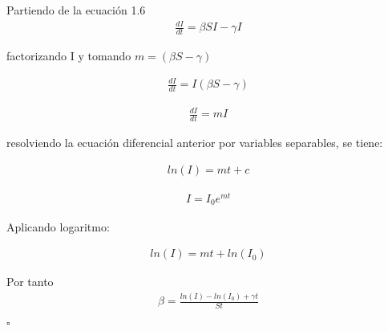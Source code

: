 \begin{Dem}
Partiendo de la ecuación 1.6 
\begin{align*}
\frac{dI}{dt} = \beta SI - \gamma I
\end{align*}

factorizando I y tomando $m = \left(\beta S - \gamma \right)$

\begin{align*}
\frac{dI}{dt} = I \left( \beta S - \gamma \right)
\end{align*}

\begin{align*}
\frac{dI}{dt} = mI
\end{align*}

resolviendo la ecuación diferencial anterior por variables separables, se tiene:

\begin{align*}
ln(I) = mt + c
\end{align*}

\begin{align*}
I = I_{0} e^{mt} 
\end{align*}

Aplicando logaritmo:

\begin{align*}
ln(I) = mt + ln(I_{0})
\end{align*}

Por tanto 
\begin{align*}
\beta = \frac{ln(I) - ln(I_{0}) + \gamma t}{St} 
\end{align*}

\hfill	$\square$

\end{Dem}









%